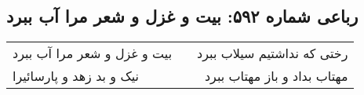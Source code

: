 \begin{center}
\section*{رباعی شماره ۵۹۲: بیت و غزل و شعر مرا آب ببرد}
\label{sec:0592}
\begin{longtable}{l p{0.5cm} r}
بیت و غزل و شعر مرا آب ببرد
&&
رختی که نداشتیم سیلاب ببرد
\\
نیک و بد زهد و پارسائیرا
&&
مهتاب بداد و باز مهتاب ببرد
\\
\end{longtable}
\end{center}
